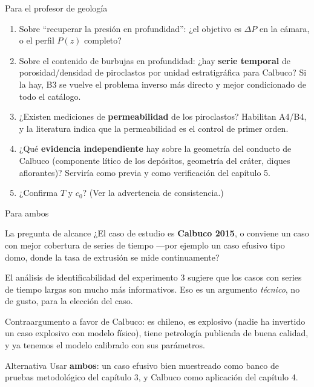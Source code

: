 \documentclass[aspectratio=169,10pt,t]{beamer}
\begin{document}
\begin{frame}{Para el profesor de geología}
\begin{enumerate}
  \item Sobre ``recuperar la presión en profundidad'': ¿el objetivo es
    $\Delta P$ en la cámara, o el perfil $P(z)$ completo?
  \item Sobre el contenido de burbujas en profundidad: ¿hay \textbf{serie
    temporal} de porosidad/densidad de piroclastos por unidad estratigráfica
    para Calbuco? Si la hay, \alert{B3 se vuelve el problema inverso más directo
    y mejor condicionado de todo el catálogo}.
  \item ¿Existen mediciones de \textbf{permeabilidad} de los piroclastos?
    Habilitan A4/B4, y la literatura indica que la permeabilidad es el control de
    primer orden.
  \item ¿Qué \textbf{evidencia independiente} hay sobre la geometría del
    conducto de Calbuco (componente lítico de los depósitos, geometría del
    cráter, diques aflorantes)? Serviría como previa y como verificación del
    capítulo 5.
  \item ¿Confirma $T$ y $c_0$? (Ver la advertencia de consistencia.)
\end{enumerate}
\end{frame}

\begin{frame}{Para ambos}
\begin{block}{La pregunta de alcance}
¿El caso de estudio es \textbf{Calbuco 2015}, o conviene un caso con mejor
cobertura de series de tiempo —por ejemplo un caso efusivo tipo domo, donde la
tasa de extrusión se mide continuamente?
\end{block}

\medskip
El análisis de identificabilidad del experimento 3 sugiere que \alert{los casos
con series de tiempo largas son mucho más informativos}. Eso es un argumento
\emph{técnico}, no de gusto, para la elección del caso.

\medskip
Contraargumento a favor de Calbuco: es chileno, es explosivo (nadie ha invertido
un caso explosivo con modelo físico), tiene petrología publicada de buena
calidad, y ya tenemos el modelo calibrado con sus parámetros.

\vspace{1em}
\begin{exampleblock}{Alternativa}
Usar \textbf{ambos}: un caso efusivo bien muestreado como banco de pruebas
metodológico del capítulo 3, y Calbuco como aplicación del capítulo 4.
\end{exampleblock}
\end{frame}
\end{document}
